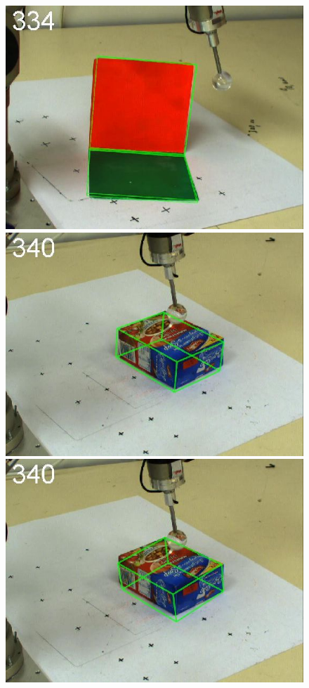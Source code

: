 \begin{figure}[htbp]
{\includegraphics[width=\imgAXwid]{images/A1_2exp_876_5}
\includegraphics[width=\imgAXwid]{images/A2_2exp_399_5}
\includegraphics[width=\imgAXwid]{images/A2_LWPR1_399_5}
}
\end{figure}
